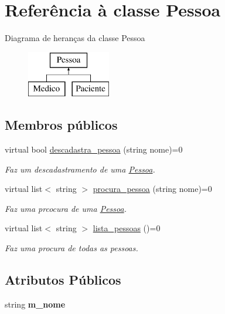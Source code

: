 \hypertarget{class_pessoa}{\section{Referência à classe Pessoa}
\label{class_pessoa}
}
Diagrama de heranças da classe Pessoa\begin{figure}[H]
\begin{center}
\leavevmode
\includegraphics[height=2.000000cm]{class_pessoa}
\end{center}
\end{figure}
\subsection*{Membros públicos}
\begin{DoxyCompactItemize}
\item 
virtual bool \hyperlink{class_pessoa_a8fdb673974e9abed1dd3687198632a6e}{descadastra\-\_\-pessoa} (string nome)=0
\begin{DoxyCompactList}\small\item\em Faz um descadastramento de uma \hyperlink{class_pessoa}{Pessoa}. \end{DoxyCompactList}\item 
virtual list$<$ string $>$ \hyperlink{class_pessoa_ad1e50046d8e441abe83a5655280ca621}{procura\-\_\-pessoa} (string nome)=0
\begin{DoxyCompactList}\small\item\em Faz uma prcocura de uma \hyperlink{class_pessoa}{Pessoa}. \end{DoxyCompactList}\item 
virtual list$<$ string $>$ \hyperlink{class_pessoa_af0fd4cc2c5177ff962f5750a314e4209}{lista\-\_\-pessoas} ()=0
\begin{DoxyCompactList}\small\item\em Faz uma procura de todas as pessoas. \end{DoxyCompactList}\end{DoxyCompactItemize}
\subsection*{Atributos Públicos}
\begin{DoxyCompactItemize}
\item 
\hypertarget{class_pessoa_a432f9981353f88c03a689fc6b402352d}{string {\bfseries m\-\_\-nome}}\label{class_pessoa_a432f9981353f88c03a689fc6b402352d}

\end{DoxyCompactItemize}


